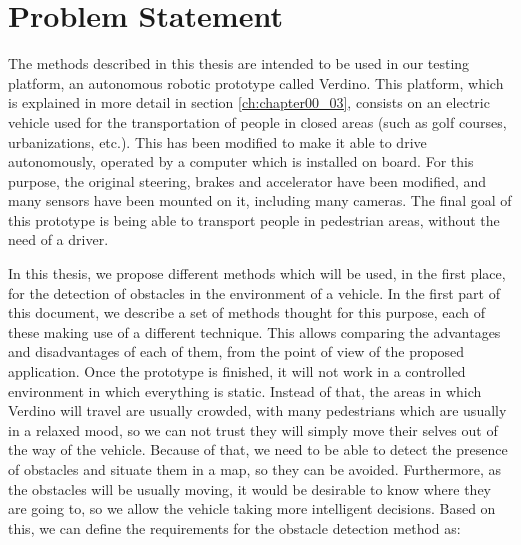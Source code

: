 \section{Problem Statement}\label{ch:chapter00_01}


The methods described in this thesis are intended to be used in our testing platform, an autonomous robotic prototype called Verdino. This platform, which is explained in more detail in section \ref{ch:chapter00_03}, consists on an electric vehicle used for the transportation of people in closed areas (such as golf courses, urbanizations, etc.). This has been modified to make it able to drive autonomously, operated by a computer which is installed on board. For this purpose, the original steering, brakes and accelerator have been modified, and many sensors have been mounted on it, including many cameras. The final goal of this prototype is being able to transport people in pedestrian areas, without the need of a driver.

In this thesis, we propose different methods which will be used, in the first place, for the detection of obstacles in the environment of a vehicle. In the first part of this document, we describe a set of methods thought for this purpose, each of these making use of a different technique. This allows comparing the advantages and disadvantages of each of them, from the point of view of the proposed application. Once the prototype is finished, it will not work in a controlled environment in which everything is static. Instead of that, the areas in which Verdino will travel are usually crowded, with many pedestrians which are usually in a relaxed mood, so we can not trust they will simply move their selves out of the way of the vehicle. Because of that, we need to be able to detect the presence of obstacles and situate them in a map, so they can be avoided. Furthermore, as the obstacles will be usually moving, it would be desirable to know where they are going to, so we allow the vehicle taking more intelligent decisions. Based on this, we can define the requirements for the obstacle detection method as:

